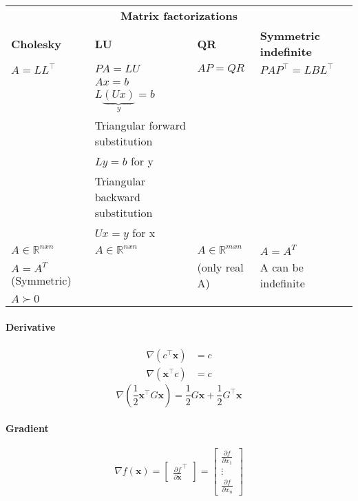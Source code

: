 
\hskip-0.5cm
\begin{tabularx}{\linewidth}{X X X X}
	\multicolumn{4}{c}{\textbf{Matrix factorizations}} \\
	\textbf{Cholesky} & \textbf{LU} & \textbf{QR} & \textbf{Symmetric indefinite}\\
	\hline
	$A = LL^\top$ & $PA = LU$ & $AP = QR$ & $PAP^\top = LBL^\top$\\ %
	\hline
	& $Ax = b$ & &\\
	& $L\underbrace{(Ux)}_{y} = b$ & &\\
	& Triangular forward substitution & &\\
	& $Ly = b$ for y & &\\
	& Triangular backward substitution & &\\
	& $Ux = y$ for x & &\\
	\hline
	$A \in \mathbb{R}^{nxn}$ & $A \in \mathbb{R}^{nxn}$ & $A \in \mathbb{R}^{mxn}$ & $A=A^T$\\
	$A=A^T$ (Symmetric) & & (only real A) & A can be indefinite\\
	$A \succ 0$ & & & \\
\end{tabularx}


\paragraph{Derivative}
\begin{equation}
\begin{split}
  \nabla(c^\top \mathbf{x}) &= c\\
  \nabla(\mathbf{x}^\top c) &= c
\end{split}
\end{equation}
%
\begin{equation}
  \nabla \left( \frac{1}{2} \mathbf{x}^\top G \mathbf{x} \right) = \frac{1}{2}G \mathbf{x} + \frac{1}{2}G^\top \mathbf{x}
\end{equation}

\paragraph{Gradient}
\begin{equation}
  \nabla f(\mathbf{x}) = \begin{bmatrix} \frac{\partial f}{\partial \mathbf{x}}^\top \end{bmatrix}
  = \begin{bmatrix}
  \frac{\partial f}{\partial x_1}\\
  \vdots\\
  \frac{\partial f}{\partial x_n}
  \end{bmatrix}
\end{equation}


